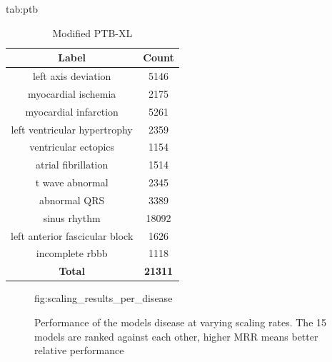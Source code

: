 \documentclass[pmlr,twocolumn]{jmlr}%
\begin{document}
\begin{table}[tbp]

\floatconts
  {tab:ptb}%
  {\caption{Modified PTB-XL}}%
  {
    \begin{tabular}{|c|c|}
     \hline
    Label & Count \\
     \hline
        left axis deviation                  &   5146 \\
        myocardial ischemia                  &   2175 \\
        myocardial infarction                &   5261 \\
        left ventricular hypertrophy         &   2359 \\
        ventricular ectopics                 &   1154 \\
        atrial fibrillation                  &   1514 \\
        t wave abnormal                      &   2345 \\
        abnormal QRS                         &   3389 \\
        sinus rhythm                         &  18092 \\
        left anterior fascicular block       &   1626 \\
        incomplete rbbb &   1118 \\
     \hline
    \textbf{Total} & \textbf{21311}\\
    \hline
    \end{tabular}
  }
\end{table}


\begin{figure}[!ht]
\floatconts
  {fig:scaling_results_per_disease}
  {\caption{Performance of the models disease at varying scaling rates. The 15 models are ranked against each other, higher MRR means better relative performance}}
  {
  }
\end{figure}
\end{document}

